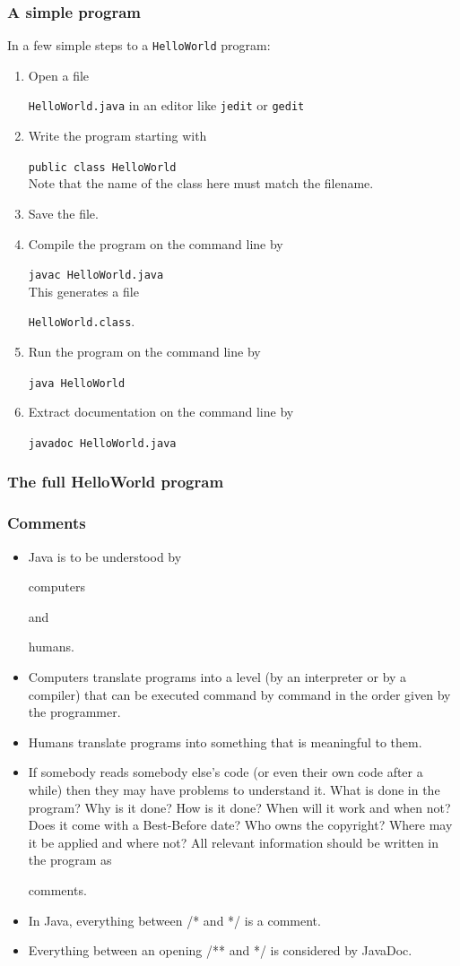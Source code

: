 \documentclass{beamer}
\def\textttb#1{\mcolor{blue}{\texttt{#1}}}
\def\mcolor#1#2{\rule{0ex}{0ex}\color{#1}#2\color{black}{}}
\begin{document}
\begin{frame}
\frametitle{A simple program}

In a few simple steps to a \texttt{HelloWorld} program:

\begin{enumerate}
 \item Open a file \textttb{HelloWorld.java} in an editor like \texttt{jedit} or \texttt{gedit}
 \item Write the program starting with\\
      \textttb{public class HelloWorld}\\
      Note that the name of the class here must match the filename.
 \item Save the file.
 \item Compile the program on the command line by\\
      \textttb{javac HelloWorld.java}\\
  This generates a file \textttb{HelloWorld.class}.
 \item Run the program on the command line by\\
      \textttb{java HelloWorld}
 \item Extract documentation on the command line by\\
      \textttb{javadoc HelloWorld.java}
\end{enumerate}
\end{frame}

\begin{frame}
\frametitle{The full HelloWorld program}

\end{frame}

\begin{frame}
\frametitle{Comments}
\begin{itemize}
\item Java is to be understood by \mcolor{blue}{computers}
  \mcolor{red}{and} \mcolor{blue}{humans}.

\item \mcolor{blue}{Computers} translate programs into a level (by an
  interpreter or by a compiler) that can be executed command by
  command in the order given by the programmer.

\item \mcolor{blue}{Humans} translate programs into something that is meaningful to them.

\item If somebody reads somebody else's code (or even their own code
  after a while) then they may have problems to understand it. 
  What is done in the program? Why is it done? How is it done?
  When will it work and when not? Does it come with a Best-Before date?
  Who owns the copyright? Where may it be applied and where not?
  All relevant information should be written in the program as \mcolor{blue}{comments}.

\item  In Java, everything between /* and */ is a comment.

\item Everything between an opening /** and */ is considered by
  JavaDoc.
\end{itemize}
\end{frame}
\end{document}
